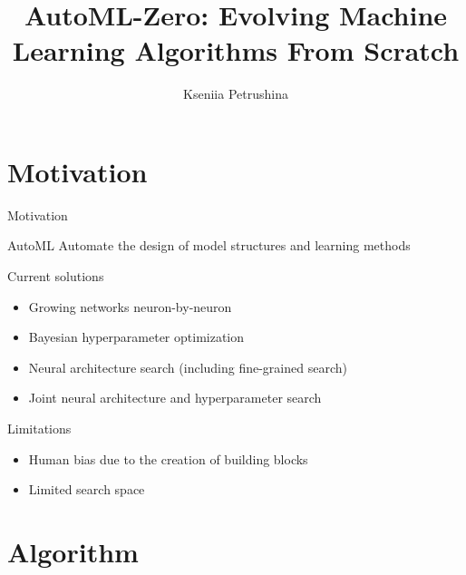 \documentclass{beamer}
\title{AutoML-Zero: Evolving Machine Learning Algorithms From Scratch}
\author{Kseniia Petrushina}
\institute{MIPT, 2024}
\begin{document}
\begin{frame}
    \titlepage
\end{frame}


\begin{frame}
    \tableofcontents
\end{frame}


\section{Motivation}
\begin{frame}{Motivation}
    \begin{block}{AutoML}
        Automate the design of model structures and learning methods
    \end{block}
    
    \begin{block}{Current solutions}
        \begin{itemize}
            \item Growing networks neuron-by-neuron
            \item Bayesian hyperparameter optimization
            \item Neural architecture search (including fine-grained search)
            \item Joint neural architecture and hyperparameter search
        \end{itemize}
    \end{block}

    \begin{block}{Limitations}
        \begin{itemize}
            \item Human bias due to the creation of building blocks
            \item Limited search space
        \end{itemize}
    \end{block}
\end{frame}


\section{Algorithm}
\end{document}
